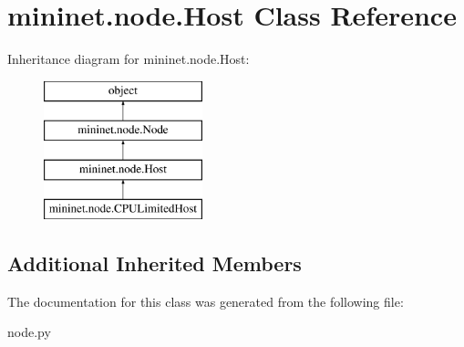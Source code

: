 \hypertarget{classmininet_1_1node_1_1Host}{\section{mininet.\-node.\-Host Class Reference}
\label{classmininet_1_1node_1_1Host}
}
Inheritance diagram for mininet.\-node.\-Host\-:\begin{figure}[H]
\begin{center}
\leavevmode
\includegraphics[height=4.000000cm]{classmininet_1_1node_1_1Host}
\end{center}
\end{figure}
\subsection*{Additional Inherited Members}


The documentation for this class was generated from the following file\-:\begin{DoxyCompactItemize}
\item 
node.\-py\end{DoxyCompactItemize}
